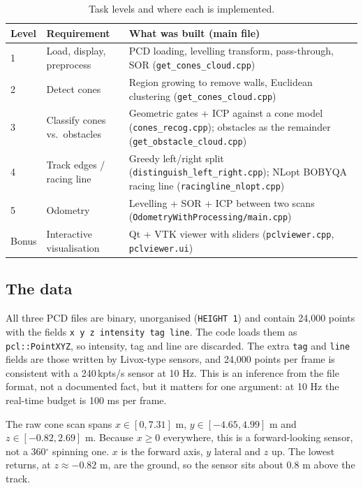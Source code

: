 \documentclass[10pt,a4paper]{scrartcl}
\renewcommand{\emph}[1]{\textcolor{accent}{#1}}
\newcommand{\code}[1]{\texttt{#1}}
\newcommand{\file}[1]{\texttt{\small #1}}
\begin{document}
  \begin{table}[H]
  \small
  \centering
  \renewcommand{\arraystretch}{1.1}
  \begin{tabularx}{\textwidth}{@{}L{1.4cm} L{4.6cm} X@{}}
  \toprule
  \textbf{Level} & \textbf{Requirement} & \textbf{What was built (main file)} \\
   & Load, display, preprocess & PCD loading, levelling transform, pass-through, SOR (\file{get\_cones\_cloud.cpp}) \\[.15cm]
  2 & Detect cones & Region growing to remove walls, Euclidean clustering (\file{get\_cones\_cloud.cpp}) \\[.15cm]
  3 & Classify cones vs.\ obstacles & Geometric gates + ICP against a cone model (\file{cones\_recog.cpp}); obstacles as the remainder (\file{get\_obstacle\_cloud.cpp}) \\[.15cm]
  4 & Track edges / racing line & Greedy left/right split (\file{distinguish\_left\_right.cpp}); NLopt BOBYQA racing line (\file{racingline\_nlopt.cpp}) \\[.15cm]
  5 & Odometry & Levelling + SOR + ICP between two scans (\file{OdometryWithProcessing/main.cpp}) \\[.15cm]
  Bonus & Interactive visualisation & Qt + VTK viewer with sliders (\file{pclviewer.cpp}, \file{pclviewer.ui}) \\
  \bottomrule
  \end{tabularx}
  \caption{Task levels and where each is implemented.}
  \label{tab:levels}
  \end{table}

  \subsection{The data}

  All three PCD files are binary, unorganised (\code{HEIGHT 1}) and contain 24,000
  points with the fields \code{x y z intensity tag line}. The code loads them as
  \code{pcl::PointXYZ}, so intensity, tag and line are discarded. The extra
  \code{tag} and \code{line} fields are those written by Livox-type sensors, and
  24,000 points per frame is consistent with a 240\,kpts/s sensor at 10 Hz. This is an
  inference from the file format, not a documented fact, but it matters for one
  argument: \emph{at 10 Hz the real-time budget is 100 ms per frame}.

  The raw cone scan spans $x\in[0,7.31]$ m, $y\in[-4.65,4.99]$ m and
  $z\in[-0.82,2.69]$ m. Because $x\ge0$ everywhere, this is a forward-looking sensor,
  not a 360$^\circ$ spinning one. $x$ is the forward axis, $y$ lateral and $z$ up.
  The lowest returns, at $z\approx-0.82$ m, are the ground, so the sensor sits
  about 0.8 m above the track.
\end{document}
